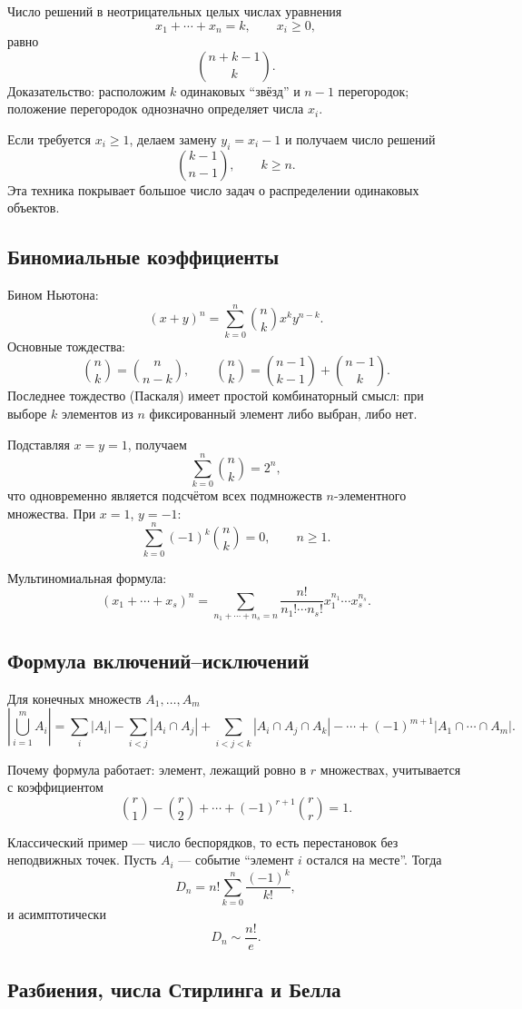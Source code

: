 Число решений в неотрицательных целых числах уравнения
\[
    x_1+\cdots+x_n=k,
    \qquad x_i\ge0,
\]
равно
\[
    \binom{n+k-1}{k}.
\]
Доказательство: расположим $k$ одинаковых ``звёзд'' и $n-1$ перегородок;
положение перегородок однозначно определяет числа $x_i$.

Если требуется $x_i\ge1$, делаем замену $y_i=x_i-1$ и получаем число решений
\[
    \binom{k-1}{n-1},\qquad k\ge n.
\]
Эта техника покрывает большое число задач о распределении одинаковых объектов.

\subsection{Биномиальные коэффициенты}

Бином Ньютона:
\[
 (x+y)^n=\sum_{k=0}^{n}\binom nk x^k y^{n-k}.
\]
Основные тождества:
\[
 \binom nk=\binom n{n-k},
 \qquad
 \binom nk=\binom{n-1}{k-1}+\binom{n-1}{k}.
\]
Последнее тождество (Паскаля) имеет простой комбинаторный смысл: при выборе
$k$ элементов из $n$ фиксированный элемент либо выбран, либо нет.

Подставляя $x=y=1$, получаем
\[
    \sum_{k=0}^n\binom nk=2^n,
\]
что одновременно является подсчётом всех подмножеств $n$-элементного множества.
При $x=1$, $y=-1$:
\[
    \sum_{k=0}^n(-1)^k\binom nk=0,
    \qquad n\ge1.
\]

Мультиномиальная формула:
\[
 (x_1+\cdots+x_s)^n=
 \sum_{n_1+\cdots+n_s=n}
 \frac{n!}{n_1!\cdots n_s!}
 x_1^{n_1}\cdots x_s^{n_s}.
\]

\subsection{Формула включений--исключений}

Для конечных множеств $A_1,\ldots,A_m$
\[
\left|\bigcup_{i=1}^{m}A_i\right|
=
\sum_i|A_i|
-\sum_{i<j}|A_i\cap A_j|
+\sum_{i<j<k}|A_i\cap A_j\cap A_k|
-\cdots
+(-1)^{m+1}|A_1\cap\cdots\cap A_m|.
\]

Почему формула работает: элемент, лежащий ровно в $r$ множествах, учитывается
с коэффициентом
\[
 \binom r1-\binom r2+\cdots+(-1)^{r+1}\binom rr=1.
\]

Классический пример --- число беспорядков, то есть перестановок без неподвижных
точек. Пусть $A_i$ --- событие ``элемент $i$ остался на месте''. Тогда
\[
    D_n=n!\sum_{k=0}^{n}\frac{(-1)^k}{k!},
\]
и асимптотически
\[
    D_n\sim \frac{n!}{e}.
\]

\subsection{Разбиения, числа Стирлинга и Белла}

